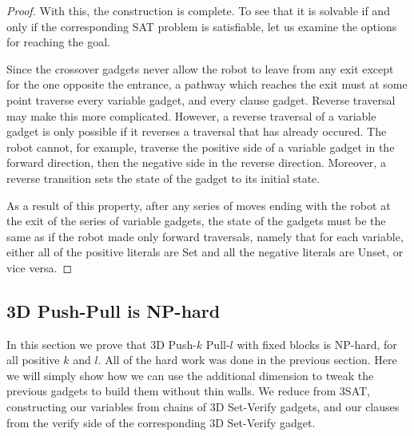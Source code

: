 \begin{proof}
    With this, the construction is complete. To see that it is solvable if and only if the corresponding SAT problem is satisfiable, let us examine the options for reaching the goal.

    Since the crossover gadgets never allow the robot to leave from any exit except for the one opposite the entrance, a pathway which reaches the exit must at some point traverse every variable gadget, and every clause gadget. Reverse traversal may make this more complicated. However, a reverse traversal of a variable gadget is only possible if it reverses a traversal that has already occured. The robot cannot, for example, traverse the positive side of a variable gadget in the forward direction, then the negative side in the reverse direction. Moreover, a reverse transition sets the state of the gadget to its initial state. 
    
    As a result of this property, after any series of moves ending with the robot at the exit of the series of variable gadgets, the state of the gadgets must be the same as if the robot made only forward traversals, namely that for each variable, either all of the positive literals are Set and all the negative literals are Unset, or vice versa.


\end{proof}


\subsection{3D Push-Pull is NP-hard}
\label{3DNPhard}
In this section we prove that 3D Push-$k$ Pull-$l$ with fixed blocks is NP-hard, for all positive $k$ and $l$. All of the hard work was done in the previous section. Here we will simply show how we can use the additional dimension to tweak the previous gadgets to build them without thin walls. We reduce from 3SAT, constructing our variables from chains of 3D Set-Verify gadgets, and our clauses from the verify side of the corresponding 3D Set-Verify gadget.

